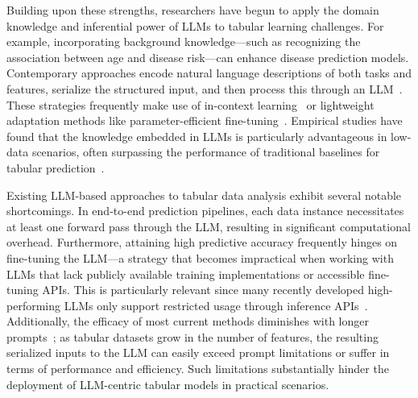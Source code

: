 Building upon these strengths, researchers have begun to apply the domain knowledge and inferential power of LLMs to tabular learning challenges. For example, incorporating background knowledge—such as recognizing the association between age and disease risk—can enhance disease prediction models. Contemporary approaches encode natural language descriptions of both tasks and features, serialize the structured input, and then process this through an LLM~\cite{dinh2022lift,wang2023anypredict}. These strategies frequently make use of in-context learning~\cite{nam2023semi} or lightweight adaptation methods like parameter-efficient fine-tuning~\cite{dinh2022lift,hegselmann2023tabllm}. Empirical studies have found that the knowledge embedded in LLMs is particularly advantageous in low-data scenarios, often surpassing the performance of traditional baselines for tabular prediction~\cite{hegselmann2023tabllm}.

Existing LLM-based approaches to tabular data analysis exhibit several notable shortcomings. In end-to-end prediction pipelines, each data instance necessitates at least one forward pass through the LLM, resulting in significant computational overhead. Furthermore, attaining high predictive accuracy frequently hinges on fine-tuning the LLM—a strategy that becomes impractical when working with LLMs that lack publicly available training implementations or accessible fine-tuning APIs. This is particularly relevant since many recently developed high-performing LLMs only support restricted usage through inference APIs~\cite{anil2023palm,openai2023gpt4}. Additionally, the efficacy of most current methods diminishes with longer prompts~\cite{liu2023lost}; as tabular datasets grow in the number of features, the resulting serialized inputs to the LLM can easily exceed prompt limitations or suffer in terms of performance and efficiency. Such limitations substantially hinder the deployment of LLM-centric tabular models in practical scenarios.


